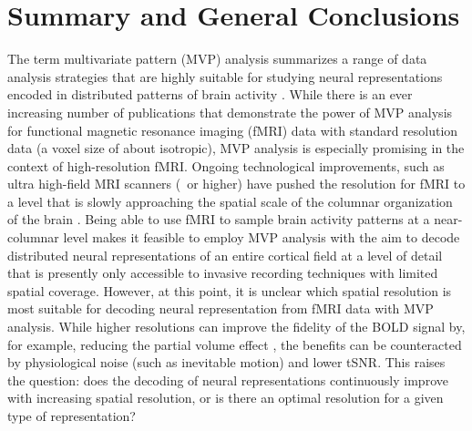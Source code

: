 
\chapter{Summary and General Conclusions}
The term multivariate pattern (MVP) analysis summarizes a range of data
analysis strategies that are highly suitable for studying neural
representations encoded in distributed patterns of brain activity
\citep{haxby_2012}. While there is an ever increasing number of publications
that demonstrate the power of MVP analysis for functional magnetic resonance
imaging (fMRI) data \citep{opdebeeck_2010,freeman_2011,alink_2013,freeman_2013}
with standard resolution data (a voxel size of about  isotropic), MVP
analysis is especially promising in the context of high-resolution fMRI.
Ongoing technological improvements, such as ultra high-field MRI scanners
(\sevenT\ or higher) have pushed the resolution for fMRI to a level
that is slowly approaching the spatial scale of the columnar organization of
the brain \citep{yacoub_2008,heidemann_2012}. Being able to use fMRI to sample
brain activity patterns at a near-columnar level makes it feasible to employ
MVP analysis with the aim to decode distributed neural representations of an
entire cortical field at a level of detail that is presently only accessible to
invasive recording techniques with limited spatial coverage. However, at this
point, it is unclear which spatial resolution is most suitable for decoding
neural representation from fMRI data with MVP analysis. While higher
resolutions can improve the fidelity of the BOLD signal by, for example,
reducing the partial volume effect \citep{Weibull_2008}, the benefits can be
counteracted by physiological noise (such as inevitable motion) and lower tSNR. 
This raises the question: does the decoding of neural representations continuously improve
with increasing spatial resolution, or is there an optimal resolution for a
given type of representation?

